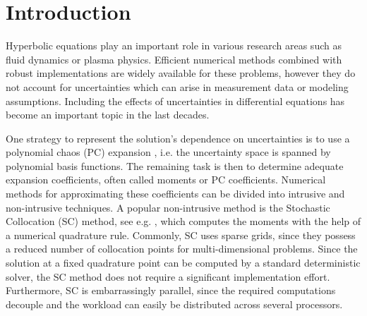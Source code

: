\section{Introduction}
Hyperbolic equations play an important role in various research areas such as fluid dynamics or plasma physics. Efficient numerical methods combined with robust implementations are widely available for these problems, however they do not account for uncertainties which can arise in measurement data or modeling assumptions. Including the effects of uncertainties in differential equations has become an important topic in the last decades. %

One strategy to represent the solution's dependence on uncertainties is to use a polynomial chaos (PC) expansion \cite{wiener1938homogeneous,xiu2002wiener}, i.e. the uncertainty space is spanned by polynomial basis functions. The remaining task is then to determine adequate expansion coefficients, often called moments or PC coefficients. Numerical methods for approximating these coefficients can be divided into intrusive and non-intrusive techniques. A popular non-intrusive method is the Stochastic Collocation (SC) method, see e.g. \cite{xiu2005high,babuvska2007stochastic,loeven2008probabilistic}, which computes the moments with the help of a numerical quadrature rule. Commonly, SC uses sparse grids, since they possess a reduced number of collocation points for multi-dimensional problems. Since the solution at a fixed quadrature point can be computed by a standard deterministic solver, the SC method does not require a significant implementation effort. Furthermore, SC is embarrassingly parallel, since the required computations decouple and the workload can easily be distributed across several processors. 

